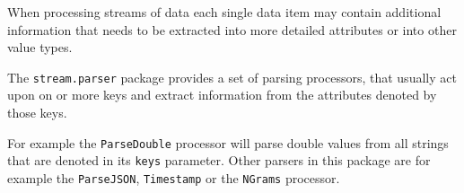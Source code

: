When processing streams of data each single data item may contain
additional information that needs to be extracted into more detailed
attributes or into other value types.

The \texttt{stream.parser} package provides a set of parsing processors,
that usually act upon on or more keys and extract information from the
attributes denoted by those keys.

For example the \texttt{ParseDouble} processor will parse double values
from all strings that are denoted in its \texttt{keys} parameter. Other
parsers in this package are for example the \texttt{ParseJSON},
\texttt{Timestamp} or the \texttt{NGrams} processor.





